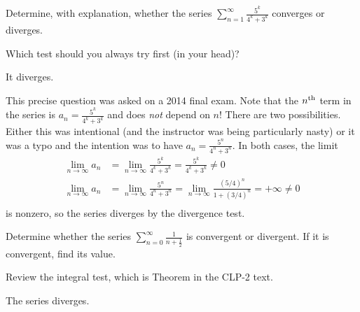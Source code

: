 
\begin{question}[2014D]
Determine, with explanation, whether the series
$\displaystyle \sum_{n=1}^\infty \frac{5^k}{4^k+3^k}$ converges
or diverges.
\end{question}

\begin{hint}
Which test should you always try first (in your head)?
\end{hint}

\begin{answer}
It diverges.
\end{answer}

\begin{solution}
This precise question was asked on a 2014 final exam. Note that the
$n^{\rm th}$ term in the series is $a_n=\frac{5^k}{4^k+3^k}$ and does
\emph{not} depend on $n$! There are two possibilities. Either this was
intentional (and the instructor was being particularly nasty) or it was a
typo and the intention was to have $a_n=\frac{5^n}{4^n+3^n}$. In both cases,
the limit
\begin{align*}
\lim_{n\to\infty} a_n
&=\lim_{n\to\infty} \frac{5^k}{4^k+3^k}
 = \frac{5^k}{4^k+3^k}
 \neq 0 \\
\lim_{n\to\infty} a_n
&=\lim_{n\to\infty} \frac{5^n}{4^n+3^n}
=\lim_{n\to\infty} \frac{(5/4)^n}{1+(3/4)^n}
 = +\infty
 \neq 0 \\
\end{align*}
is nonzero,  so the series diverges by the divergence test.
\end{solution}

\begin{Mquestion}[2016Q5]
Determine whether the series
$\displaystyle\sum_{n=0}^\infty\frac{1}{n+\frac{1}{2}}$
is convergent or divergent. If it is convergent, find its value.
\end{Mquestion}

\begin{hint}
Review the integral test, which is
Theorem  in the CLP-2 text.
\end{hint}

\begin{answer}
The series diverges.
\end{answer}

